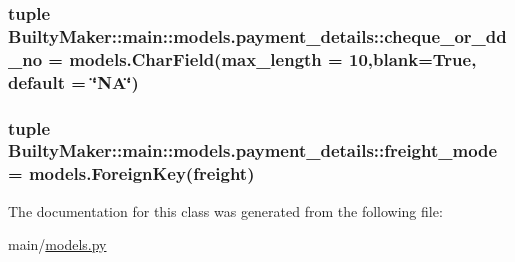 \hypertarget{classBuiltyMaker_1_1main_1_1models_1_1payment__details_a1710bfc8f5a4d89c35273cbe418f5934}{
\subsubsection[{cheque\-\_\-or\-\_\-dd\-\_\-no}]{\setlength{\rightskip}{0pt plus 5cm}tuple {\bf \-Builty\-Maker\-::main\-::models.\-payment\-\_\-details\-::cheque\-\_\-or\-\_\-dd\-\_\-no} = models.\-Char\-Field(max\-\_\-length = 10,blank=\-True, default = \char`\"{}\-N\-A\char`\"{})}}\label{classBuiltyMaker_1_1main_1_1models_1_1payment__details_a1710bfc8f5a4d89c35273cbe418f5934}
\hypertarget{classBuiltyMaker_1_1main_1_1models_1_1payment__details_afef6081afb92d6cd4a706e8a2ede11d6}{
\subsubsection[{freight\-\_\-mode}]{\setlength{\rightskip}{0pt plus 5cm}tuple {\bf \-Builty\-Maker\-::main\-::models.\-payment\-\_\-details\-::freight\-\_\-mode} = models.\-Foreign\-Key({\bf freight})}}\label{classBuiltyMaker_1_1main_1_1models_1_1payment__details_afef6081afb92d6cd4a706e8a2ede11d6}


\-The documentation for this class was generated from the following file\-:\begin{DoxyCompactItemize}
\item 
main/\hyperlink{models_8py}{models.\-py}\end{DoxyCompactItemize}
